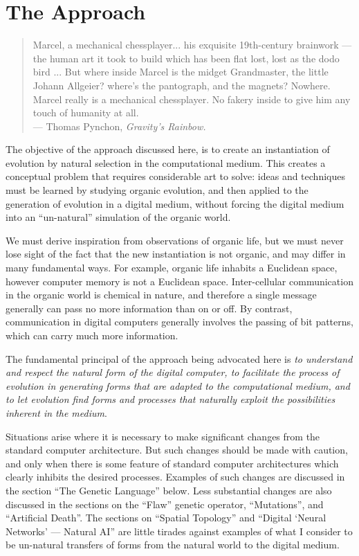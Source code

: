 \section{The Approach}

\begin{quote}
Marcel, a mechanical chessplayer... his exquisite 19th-century brainwork
--- the human art it took to build which has been flat lost, lost as the
dodo bird ...  But where inside Marcel is the midget Grandmaster, the
little Johann Allgeier?  where's the pantograph, and the magnets?  Nowhere.
Marcel really is a mechanical chessplayer.  No fakery inside to give
him any touch of humanity at all.\\
\hspace*{2in}--- Thomas Pynchon, \it Gravity's Rainbow\rm .
\end{quote}

The objective of the approach discussed here, is to create an
instantiation of evolution by natural selection in the computational
medium.  This creates a conceptual problem that requires considerable
art to solve: ideas and techniques must be learned by studying organic
evolution, and then applied to the generation of evolution in a digital
medium, without forcing the digital medium into an ``un-natural''
simulation of the organic world.

We must derive inspiration from observations of organic life, but we
must never lose sight of the fact that the new instantiation is not
organic, and may differ in many fundamental ways.  For example,
organic life inhabits a Euclidean space, however computer memory is
not a Euclidean space.  Inter-cellular communication in the organic
world is chemical in nature, and therefore a single message generally
can pass no more information than on or off.  By contrast,
communication in digital computers generally involves the passing of
bit patterns, which can carry much more information.

The fundamental principal of the approach being advocated here is
{\it to understand and respect the natural form of the digital computer,
to facilitate the process of evolution in generating forms that are
adapted to the computational medium, and to let evolution find forms
and processes that naturally exploit the possibilities inherent in the
medium}.

Situations arise where it is necessary to make significant changes from
the standard computer architecture.  But such changes should be
made with caution, and only when there is some feature of standard
computer architectures which clearly inhibits the desired processes.
Examples of such changes are discussed in the section ``The Genetic
Language'' below.  Less substantial changes are also discussed in the
sections on the ``Flaw'' genetic operator, ``Mutations'', and
``Artificial Death''.  The sections on ``Spatial Topology'' and
``Digital `Neural Networks' --- Natural AI'' are little tirades against
examples of what I consider to be un-natural transfers of forms from
the natural world to the digital medium.


